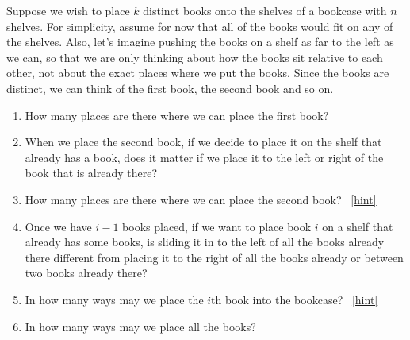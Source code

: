 \documentclass{book}
\begin{document}
\setcounter{project}{124}
\addtocounter{project}{-1}
\begin{activity}[]\label{bookcase}
\hypertarget{p-866}{}%
Suppose we wish to place \(k\) distinct books onto the shelves of a bookcase with \(n\) shelves. For simplicity, assume for now that all of the books would fit on any of the shelves. Also, let's imagine pushing the books on a shelf as far to the left as we can, so that we are only thinking about how the books sit relative to each other, not about the exact places where we put the books. Since the books are distinct, we can think of the first book, the second book and so on.%
\begin{enumerate}[font=\bfseries,label=(\alph*),ref=\alph*]
\item\label{task-164} \hypertarget{p-867}{}%
How many places are there where we can place the first book?%
\item\label{task-165} \hypertarget{p-869}{}%
When we place the second book, if we decide to place it on the shelf that already has a book, does it matter if we place it to the left or right of the book that is already there?%
\item\label{task-166} \hypertarget{p-871}{}%
How many places are there where we can place the second book?%
~\hfill{\tiny\hyperlink{a-124.c}{[hint]}\hypertarget{q-124.c}{}}\item\label{task-167} \hypertarget{p-874}{}%
Once we have \(i-1\) books placed, if we want to place book \(i\)  on a shelf that already has some books, is sliding it in to the left of all the books already there different from placing it to the right of all the books already or between two books already there?%
\item\label{task-168} \hypertarget{p-876}{}%
In how many ways may we place the \(i\)th book into the bookcase?%
~\hfill{\tiny\hyperlink{a-124.e}{[hint]}\hypertarget{q-124.e}{}}\item\label{task-169} \hypertarget{p-879}{}%
In how many ways may we place all the books?%
\end{enumerate}
\end{activity}
\end{document}
